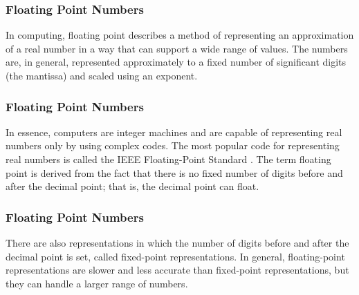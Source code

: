 \documentclass[12pt]{beamer} %
\begin{document}
\begin{frame}
\frametitle{Floating Point Numbers}

In computing, floating point describes a method of 
representing an approximation of a real number in a 
way that can support a wide range of values. 
The numbers are, in general, represented approximately 
to a fixed number of significant digits (the mantissa) and scaled using an exponent. 
\end{frame}
\begin{frame}
\frametitle{Floating Point Numbers}
In essence, computers are integer machines and are capable of representing real numbers only by using complex codes. The most popular code for representing real numbers is called the IEEE Floating-Point Standard .
The term floating point is derived from the fact that there is no fixed number of digits before and after the decimal point; that is, the decimal point can float. 
\end{frame}
\begin{frame}
\frametitle{Floating Point Numbers}
There are also representations in 
which the number of digits before and after the decimal point is set, called fixed-point representations. In general, floating-point representations are slower and less accurate than fixed-point representations, but they can handle a larger range of numbers.
\end{frame}
\end{document}
